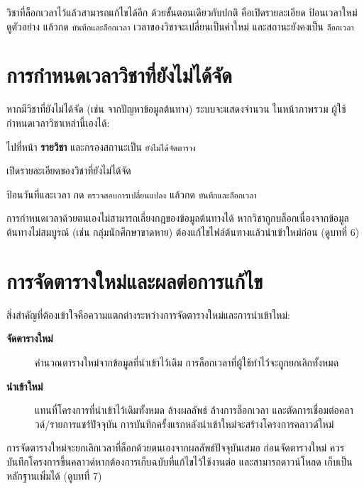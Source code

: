 วิชาที่ล็อกเวลาไว้แล้วสามารถแก้ไขได้อีก ด้วยขั้นตอนเดียวกับปกติ
คือเปิดรายละเอียด ป้อนเวลาใหม่ ดูตัวอย่าง แล้วกด \texttt{บันทึกและล็อกเวลา}
เวลาของวิชาจะเปลี่ยนเป็นค่าใหม่ และสถานะยังคงเป็น \texttt{ล็อกเวลา}

\section{การกำหนดเวลาวิชาที่ยังไม่ได้จัด}

หากมีวิชาที่ยังไม่ได้จัด (เช่น จากปัญหาข้อมูลต้นทาง) ระบบจะแสดงจำนวน
ในหน้าภาพรวม ผู้ใช้กำหนดเวลาวิชาเหล่านี้เองได้:

\begin{steps}
  \item ไปที่หน้า \textbf{รายวิชา} และกรองสถานะเป็น \texttt{ยังไม่ได้จัดตาราง}
  \item เปิดรายละเอียดของวิชาที่ยังไม่ได้จัด
  \item ป้อนวันที่และเวลา กด \texttt{ตรวจสอบการเปลี่ยนแปลง}
        แล้วกด \texttt{บันทึกและล็อกเวลา}
\end{steps}

\begin{caution}
การกำหนดเวลาด้วยตนเองไม่สามารถเลี่ยงกฎของข้อมูลต้นทางได้
หากวิชาถูกบล็อกเนื่องจากข้อมูลต้นทางไม่สมบูรณ์ (เช่น กลุ่มนักศึกษาขาดหาย)
ต้องแก้ไขไฟล์ต้นทางแล้วนำเข้าใหม่ก่อน (ดูบทที่ 6)
\end{caution}

\section{การจัดตารางใหม่และผลต่อการแก้ไข}

สิ่งสำคัญที่ต้องเข้าใจคือความแตกต่างระหว่างการจัดตารางใหม่และการนำเข้าใหม่:

\begin{description}
  \item[\textbf{จัดตารางใหม่}] คำนวณตารางใหม่จากข้อมูลที่นำเข้าไว้เดิม
        การล็อกเวลาที่ผู้ใช้ทำไว้จะถูกยกเลิกทั้งหมด
  \item[\textbf{นำเข้าใหม่}] แทนที่โครงการที่นำเข้าไว้เดิมทั้งหมด ล้างผลลัพธ์
        ล้างการล็อกเวลา และตัดการเชื่อมต่อคลาวด์/รายการแชร์ปัจจุบัน
        การบันทึกครั้งแรกหลังนำเข้าใหม่จะสร้างโครงการคลาวด์ใหม่
\end{description}

\begin{caution}
การจัดตารางใหม่จะยกเลิกเวลาที่ล็อกด้วยตนเองจากผลลัพธ์ปัจจุบันเสมอ
ก่อนจัดตารางใหม่ ควรบันทึกโครงการขึ้นคลาวด์หากต้องการเก็บฉบับที่แก้ไขไว้ใช้งานต่อ
และสามารถดาวน์โหลด  เก็บเป็นหลักฐานเพิ่มได้ (ดูบทที่ 7)
\end{caution}




